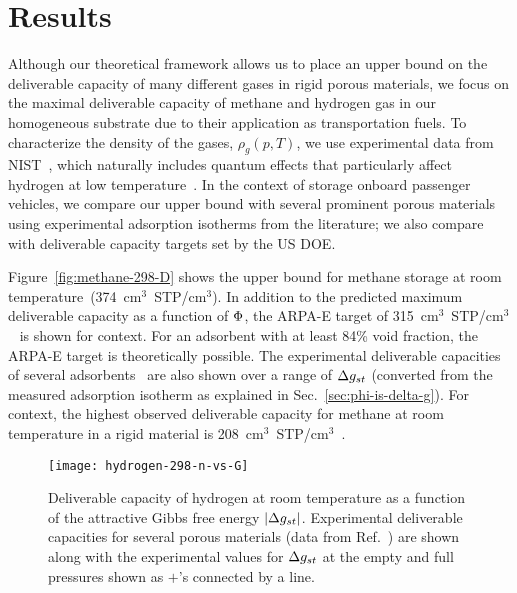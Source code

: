 \section{Results}
Although our theoretical framework allows us to place an upper bound on the
deliverable capacity of many different gases in rigid porous materials, we
focus on the maximal deliverable capacity of methane and hydrogen gas in our
homogeneous substrate due to their application as transportation fuels. To
characterize the density of the gases, $\rho_g(p, T)$, we use experimental data
from NIST~\cite{nist}, which naturally includes quantum effects that
particularly affect hydrogen at low temperature~\cite{kumar2006quantum}. In the
context of storage onboard passenger vehicles, we compare our upper bound with
several prominent porous materials using experimental adsorption isotherms from
the literature; we also compare with deliverable capacity targets set by the US
DOE.

Figure~\ref{fig:methane-298-D} shows the upper bound for methane storage at
room temperature~(374~cm$^3$~STP/cm$^3$). In addition to the predicted maximum
deliverable capacity as a function of $\Phi$, the ARPA-E target of
315~cm$^3$~STP/cm$^3$~\cite{arpaemove} is shown for context. For an adsorbent
with at least 84\% void fraction, the ARPA-E target is theoretically possible.
The experimental deliverable capacities of several
adsorbents~\cite{mason2014evaluating} are also shown over a range of $\Delta g_{st}$
(converted from the measured adsorption isotherm as explained in
Sec.~\ref{sec:phi-is-delta-g}). For context, the highest observed
deliverable capacity for methane at room temperature in a rigid material is 208~cm$^3$~STP/cm$^3$~\cite{simon2015materials}.

\begin{figure}
    \centering
    \texttt{[image: hydrogen-298-n-vs-G]}
    \caption{Deliverable capacity of hydrogen at room temperature as a function of the attractive Gibbs free energy $|\Delta g_{st}|$.  Experimental deliverable capacities for several porous materials (data from Ref.~\cite{mason2014evaluating, garcia2018benchmark}) are shown along with the experimental values for $\Delta g_{st}$ at the empty and full pressures shown as $+$'s connected by a line.}
    \label{fig:hydrogen-298-D}
\end{figure}

